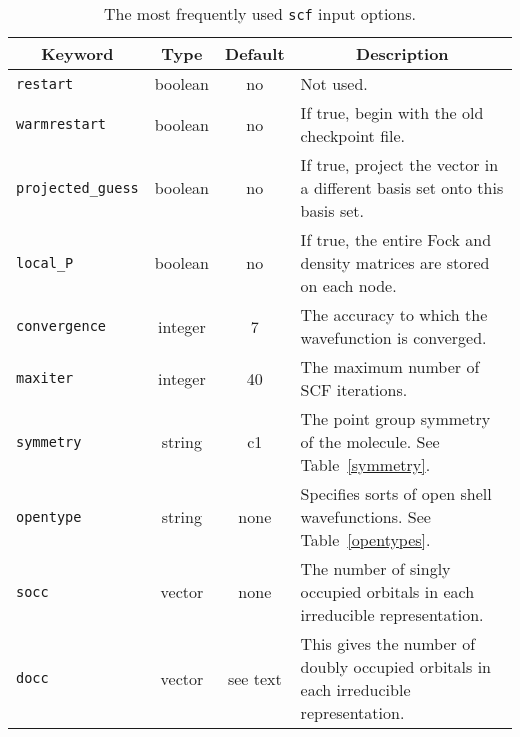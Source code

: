 \begin{table}
\centering
\begin{tabular}{|lccp{2.75in}|}
\hline
\multicolumn{1}{|c}{Keyword} & \multicolumn{1}{c}{Type} &
  \multicolumn{1}{c}{Default} & \multicolumn{1}{c|}{Description} \\
\hline
  {\tt restart}           &boolean& no & Not used.                           \\
  {\tt warmrestart}       &boolean& no & If true, begin with the old
                                         checkpoint file.\\
  {\tt projected\_guess}  &boolean& no & If true, project the vector in a 
                                         different basis set onto this basis
                                         set. \\
  {\tt local\_P}          &boolean& no & If true, the entire Fock and
                                         density matrices are stored on
                                         each node. \\
  {\tt convergence}       &integer&  7 & The accuracy to which the
                                         wavefunction is converged. \\
  {\tt maxiter}           &integer& 40 & The maximum number of SCF iterations.\\
  {\tt symmetry}          &string & c1 & The point group symmetry of the
                                         molecule. See Table~\ref{symmetry}.\\
  {\tt opentype}          &string &none& Specifies
                                         sorts of open shell wavefunctions.
                                         See Table~\ref{opentypes}. \\
  {\tt socc}              &vector &none& The number of singly
                                         occupied orbitals in each
                                         irreducible representation. \\
  {\tt docc}              &vector &see text& This gives the number of doubly
                                         occupied orbitals in each
                                         irreducible representation. \\
\hline
\end{tabular}
\caption{The most frequently used {\tt scf} input options.}
\label{scfinputa}
\end{table}
